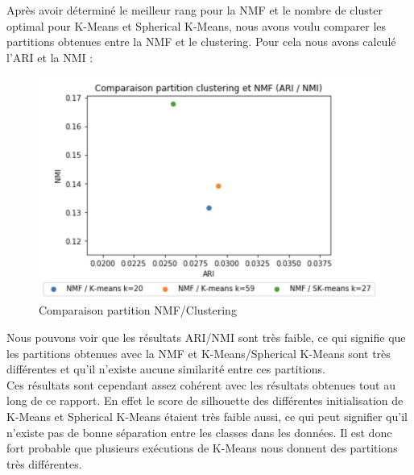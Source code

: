 \documentclass[runningheads]{llncs}
\begin{document}
Après avoir déterminé le meilleur rang pour la NMF et le nombre de cluster optimal pour K-Means et Spherical K-Means, nous avons voulu comparer les partitions obtenues entre la NMF et le clustering. Pour cela nous avons calculé l'ARI et la NMI : 

\begin{figure}[H]
\centering
\includegraphics[width=1\textwidth]{partition.png}
\caption{Comparaison partition NMF/Clustering}
  \label{fig:recomposition}
\end{figure}

Nous pouvons voir que les résultats ARI/NMI sont très faible, ce qui signifie que les partitions obtenues avec la NMF et K-Means/Spherical K-Means sont très différentes et qu'il n'existe aucune similarité entre ces partitions. \\
Ces résultats sont cependant assez cohérent avec les résultats obtenues tout au long de ce rapport. En effet le score de silhouette des différentes initialisation de K-Means et Spherical K-Means étaient très faible aussi, ce qui peut signifier qu'il n'existe pas de bonne séparation entre les classes dans les données. Il est donc fort probable que plusieurs exécutions de K-Means nous donnent des partitions très différentes.

\newpage
\end{document}
